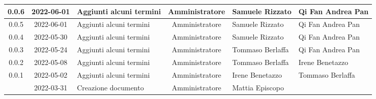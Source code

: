 \begin{center}
\begin{longtable}{ |c|c|p{8em}|c|m{5em}|m{6em}| }
	\hline
	0.0.6 & 2022-06-01 & Aggiunti alcuni termini & Amministratore & Samuele \newline Rizzato &Qi Fan \newline Andrea Pan \\
	\hline
	0.0.5 & 2022-06-01 & Aggiunti alcuni termini & Amministratore & Samuele \newline Rizzato &Qi Fan \newline Andrea Pan \\
	\hline
	0.0.4 & 2022-05-30 & Aggiunti alcuni termini & Amministratore & Samuele \newline Rizzato & Qi Fan \newline Andrea Pan\\
	\hline
	0.0.3 & 2022-05-24 & Aggiunti alcuni termini & Amministratore & Tommaso \newline Berlaffa & Qi Fan \newline Andrea Pan\\
	\hline
	0.0.2 & 2022-05-08 & Aggiunti alcuni termini & Amministratore & Tommaso \newline Berlaffa & Irene \newline Benetazzo\\
	\hline
	0.0.1 & 2022-05-02 & Aggiunti alcuni termini & Amministratore & Irene \newline Benetazzo & Tommaso \newline Berlaffa\\
	\hline
  	& 2022-03-31 & Creazione documento & Amministratore & Mattia \newline Episcopo & \\ 
	\hline
	\end{longtable}
	\end{center}
	\newpage